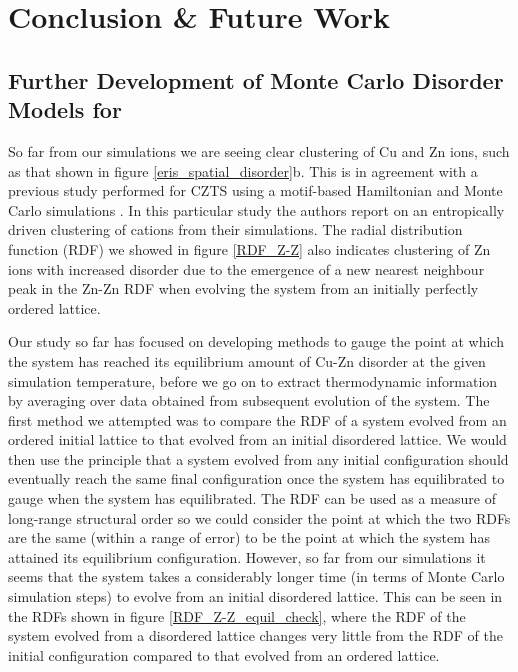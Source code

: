 
\chapter{Conclusion \& Future Work}
\label{ch:conclusions}

\section{Further Development of Monte Carlo Disorder Models for {\CZTS}}\label{eris_future_work}
So far from our simulations we are seeing clear clustering of Cu and Zn ions, such as that shown in figure \ref{eris_spatial_disorder}b. This is in agreement with a previous study performed for CZTS using a motif-based Hamiltonian and Monte Carlo simulations \cite{Lany_CZTS}. In this particular study the authors report on an entropically driven clustering of cations from their simulations. The radial distribution function (RDF) we showed in figure \ref{RDF_Z-Z} also indicates clustering of Zn ions with increased disorder due to the emergence of a new nearest neighbour peak in the Zn-Zn RDF when evolving the system from an initially perfectly ordered lattice.

Our study so far has focused on developing methods to gauge the point at which the system has reached its equilibrium amount of Cu-Zn disorder at the given simulation temperature, before we go on to extract thermodynamic information by averaging over data obtained from subsequent evolution of the system. The first method we attempted was to compare the RDF of a system evolved from an ordered initial lattice to that evolved from an initial disordered lattice. We would then use the principle that a system evolved from any initial configuration should eventually reach the same final configuration once the system has equilibrated to gauge when the system has equilibrated. The RDF can be used as a measure of long-range structural order so we could consider the point at which the two RDFs are the same (within a range of error) to be the point at which the system has attained its equilibrium configuration. However, so far from our simulations it seems that the system takes a considerably longer time (in terms of Monte Carlo simulation steps) to evolve from an initial disordered lattice. This can be seen in the RDFs shown in figure \ref{RDF_Z-Z_equil_check}, where the RDF of the system evolved from a disordered lattice changes very little from the RDF of the initial configuration compared to that evolved from an ordered lattice. 

